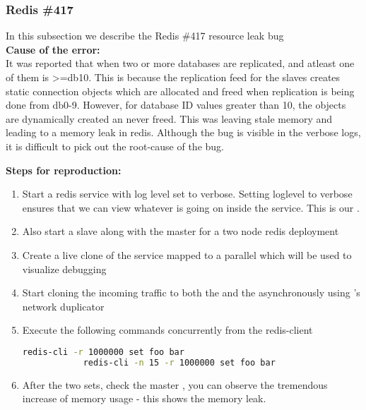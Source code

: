 \subsubsection{Redis \#417}

In this subsection we describe the Redis \#417 resource leak bug \\

\noindent \textbf{Cause of the error:} \\

It was reported that when two or more databases are replicated, and atleast one of them is \textgreater=db10. This is because the replication feed for the slaves creates static connection objects which are allocated and freed when replication is being done from db0-9. However, for database ID values greater than 10, the objects are dynamically created an never freed.
This was leaving stale memory and leading to a memory leak in redis.
Although the bug is visible in the verbose logs, it is difficult to pick out the root-cause of the bug.

\noindent \textbf{Steps for reproduction:} \\

\begin{adjustwidth}{0.5cm}{}
	\begin{enumerate}
		\item Start a redis service with log level set to verbose. Setting loglevel to verbose ensures that we can view whatever is going on inside the service. This is our \productioncontainer.
		\item Also start a slave along with the master for a two node redis deployment
		\item Create a live clone of the service mapped to a parallel \debugcontainer which will be used to visualize debugging
		\item Start cloning the incoming traffic to both the \productioncontainer and the \debugcontainer asynchronously using \parikshan's network duplicator
		
		\item Execute the following commands concurrently from the redis-client
		
		\begin{lstlisting}[language=sh]
			redis-cli -r 1000000 set foo bar
			redis-cli -n 15 -r 1000000 set foo bar
		\end{lstlisting}
		
		\item After the two sets, check the master \debugcontainer, you can observe the tremendous increase of memory usage - this shows the memory leak.
		
	\end{enumerate}
\end{adjustwidth}	


